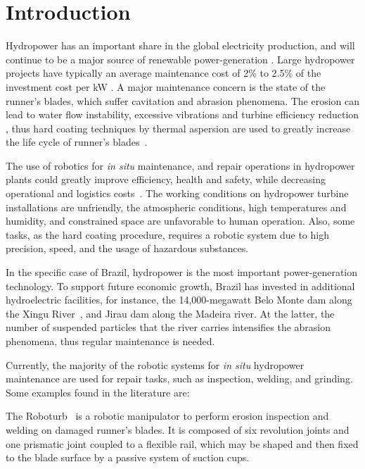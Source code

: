 \section{Introduction}

Hydropower has an important share in the global electricity production, and
will continue to be a major source of renewable power-generation \cite{iea}.
Large hydropower projects have typically an ave\-rage maintenance cost of 2\%
to 2.5\% of the investment cost per kW \cite{irena}. A major maintenance concern
is the state of the runner's blades, which suffer cavitation and abrasion phenomena. The erosion can lead to water flow instability, excessive
vibrations and turbine efficiency reduction \cite{goldemberg2007energia}, thus
hard coating techniques by thermal aspersion are used to greatly increase the
life cycle of runner's blades~\cite{krella2011new}.

The use of robotics for \textit{in situ} maintenance, and repair operations in
hydropower plants could greatly improve efficiency, health and safety, while
decreasing operational and logistics costs~\cite{hazel2012field}. The working
conditions on hydropower turbine installations are unfriendly, the atmospheric
conditions, high temperatures and humidity, and constrained space are
unfavorable to human operation. Also, some tasks, as the hard coating
procedure, requires a robotic system due to high precision, speed, and the
usage of hazardous substances.

In the specific case of Brazil, hydropower is the most important
power-generation technology. To support future economic growth, Brazil has
invested in additional hydroelectric facilities, for instance, the
14,000-megawatt Belo Monte dam along the Xingu River~\cite{eia}, and Jirau dam
along the Madeira river. At the latter, the number of suspended particles that
the river carries intensifies the abrasion phenomena, thus regular maintenance
is needed.

Currently, the majority of the robotic systems for \textit{in situ} hydropower
maintenance are used for repair tasks, such as inspection, welding, and
grinding. Some examples found in the literature are:

The Roboturb~\cite{roboturb} is a robotic manipulator to perform erosion
inspection and welding on damaged runner's blades. It is composed of six
revolution joints and one prismatic joint coupled to a flexible rail, which may
be shaped and then fixed to the blade surface by a passive system of suction cups.

